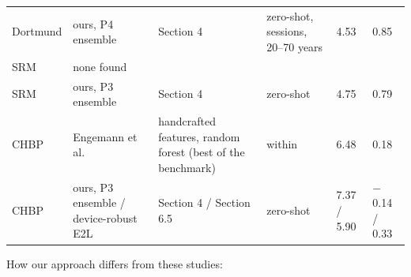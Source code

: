 \documentclass[11pt,a4paper]{article}
\begin{document}
\begin{table}[t]
{\begin{tabular}{llllll}
Dortmund & ours, P4 ensemble & Section 4 & zero-shot, sessions, 20--70 years & 4.53 & 0.85 \\
SRM & none found &  &  &  &  \\
SRM & ours, P3 ensemble & Section 4 & zero-shot & 4.75 & 0.79 \\
CHBP & Engemann et al.~\citep{engemann2022benchmark} & handcrafted features, random forest (best of the benchmark) & within & 6.48 & 0.18 \\
CHBP & ours, P3 ensemble / device-robust E2L & Section 4 / Section 6.5 & zero-shot & 7.37 / 5.90 & $-$0.14 / 0.33 \\
\bottomrule
\end{tabular}
}
\end{table}


How our approach differs from these studies:
\end{document}
